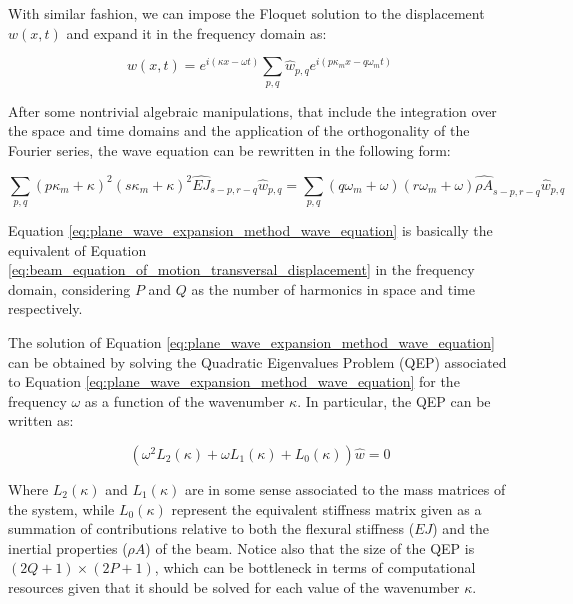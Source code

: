 With similar fashion, we can impose the Floquet solution to the displacement $w(x, t)$ and expand it in the frequency domain as:

\begin{equation}
    w(x, t) = e^{i (\kappa x - \omega t)} \sum_{p, q} \widehat{w}_{p,q} e^{i (p\kappa_m x - q\omega_m t)}
\end{equation}

After some nontrivial algebraic manipulations, that include the integration over the space and time domains and the application of the orthogonality of the Fourier series, the wave equation can be rewritten in the following form:

\begin{equation}
    \sum_{p, q} \left( p \kappa_m + \kappa \right)^2 \left( s \kappa_m + \kappa \right)^2 \widehat{EJ}_{s-p, r-q} \widehat{w}_{p,q} = \sum_{p, q} \left( q \omega_m + \omega \right) \left( r \omega_m + \omega \right) \widehat{\rho A}_{s-p, r-q} \widehat{w}_{p,q}
    \label{eq:plane_wave_expansion_method_wave_equation}
\end{equation}

Equation \ref{eq:plane_wave_expansion_method_wave_equation} is basically the equivalent of Equation \ref{eq:beam_equation_of_motion_transversal_displacement} in the frequency domain, considering $P$ and $Q$ as the number of harmonics in space and time respectively.

The solution of Equation \ref{eq:plane_wave_expansion_method_wave_equation} can be obtained by solving the Quadratic Eigenvalues Problem (QEP) associated to Equation \ref{eq:plane_wave_expansion_method_wave_equation} for the frequency $\omega$ as a function of the wavenumber $\kappa$.
In particular, the QEP can be written as:

\begin{equation}
    \left( \omega^2 L_2 (\kappa) + \omega L_1 (\kappa) + L_0 (\kappa) \right) \widehat{w} = 0
\end{equation}

Where $L_2 (\kappa)$ and $L_1 (\kappa)$ are in some sense associated to the mass matrices of the system, while $L_0 (\kappa)$ represent the equivalent stiffness matrix given as a summation of contributions relative to both the flexural stiffness ($EJ$) and the inertial properties ($\rho A$) of the beam.
Notice also that the size of the QEP is $(2Q + 1)\times(2P + 1)$, which can be bottleneck in terms of computational resources given that it should be solved for each value of the wavenumber $\kappa$.



